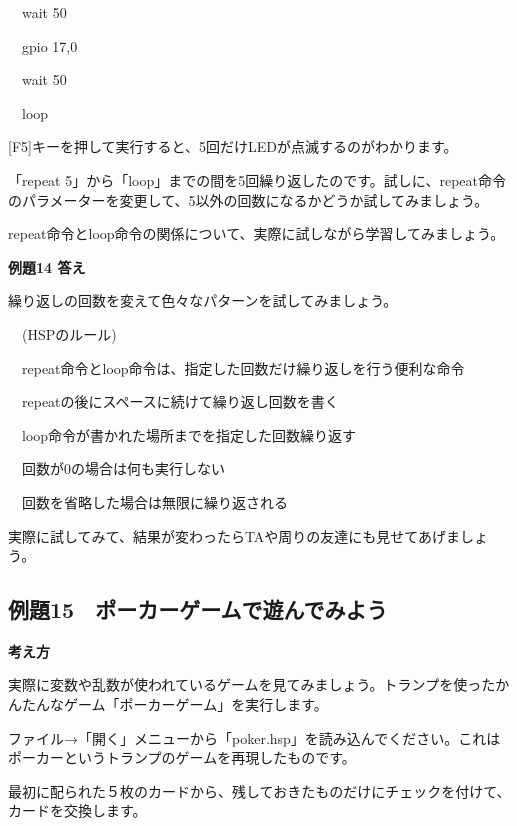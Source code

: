 \documentclass[a4paper,12pt]{jarticle}
\begin{document}
\ \ wait 50

\ \ gpio 17,0

\ \ wait 50

\ \ loop

\bigskip

[F5]キーを押して実行すると、5回だけLEDが点滅するのがわかります。

「repeat
5」から「loop」までの間を5回繰り返したのです。試しに、repeat命令のパラメーターを変更して、5以外の回数になるかどうか試してみましょう。

repeat命令とloop命令の関係について、実際に試しながら学習してみましょう。

\bigskip
\bigskip

{\bfseries
例題14 答え}

\bigskip

繰り返しの回数を変えて色々なパターンを試してみましょう。

\bigskip

\ \ (HSPのルール)

\bigskip

\ \ repeat命令とloop命令は、指定した回数だけ繰り返しを行う便利な命令

\ \ repeatの後にスペースに続けて繰り返し回数を書く

\ \ loop命令が書かれた場所までを指定した回数繰り返す

\ \ 回数が0の場合は何も実行しない

\ \ 回数を省略した場合は無限に繰り返される


\bigskip

実際に試してみて、結果が変わったらTAや周りの友達にも見せてあげましょう。




\clearpage
\subsection{例題15　ポーカーゲームで遊んでみよう}
\bigskip
\bigskip

{\bfseries
考え方}

\bigskip

実際に変数や乱数が使われているゲームを見てみましょう。トランプを使ったかんたんなゲーム「ポーカーゲーム」を実行します。

ファイル→「開く」メニューから「poker.hsp」を読み込んでください。これはポーカーというトランプのゲームを再現したものです。

最初に配られた５枚のカードから、残しておきたものだけにチェックを付けて、カードを交換します。
\end{document}
